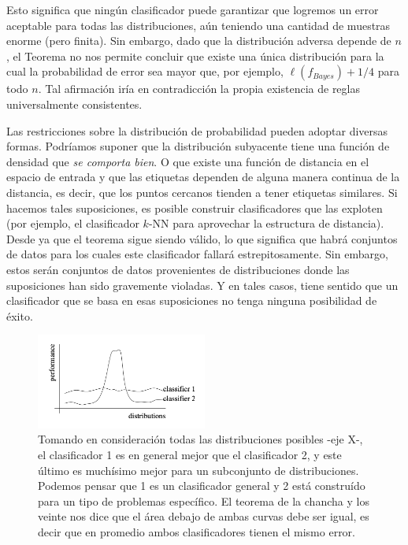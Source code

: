 \documentclass{report}
\begin{document}
Esto significa que ningún clasificador puede garantizar que logremos un error aceptable 
para todas las distribuciones, aún teniendo una cantidad de muestras enorme (pero finita). 
Sin embargo, dado que la distribución adversa depende de \(n\), 
el Teorema no nos permite concluir que existe una única distribución para la cual la 
probabilidad de error sea mayor que, por ejemplo, \(\ell(f_{Bayes}) + 1/4\) para todo \(n\). Tal afirmación 
iría en contradicción la propia existencia de reglas universalmente consistentes. \newline


Las restricciones sobre la distribución de probabilidad pueden adoptar diversas formas. Podríamos suponer que la distribución 
subyacente tiene una función de densidad que \textit{se comporta bien}. O
que existe una función de distancia en el espacio de entrada y que las etiquetas dependen de alguna manera 
continua de la distancia, es decir, que los puntos cercanos tienden a tener etiquetas similares. Si 
hacemos tales suposiciones, es posible construir clasificadores que las exploten (por ejemplo, el clasificador 
\(k\)-NN para aprovechar la estructura de distancia). Desde ya que el teorema sigue siendo válido, lo que significa que habrá conjuntos de datos 
para los cuales este clasificador fallará estrepitosamente. Sin embargo, estos serán conjuntos de datos 
provenientes de distribuciones donde las suposiciones han sido gravemente violadas. Y en tales casos, tiene 
sentido que un clasificador que se basa en esas suposiciones no tenga ninguna posibilidad de éxito.

\begin{figure}[ht!]
    \centering
    \includegraphics[width=0.5\textwidth]{Images/7.png}
    \caption{Tomando en consideración todas las distribuciones posibles -eje X-, el clasificador 1
    es en general mejor que el clasificador 2, y este último es muchísimo mejor para un subconjunto
    de distribuciones. Podemos pensar que 1 es un clasificador general y 2 está construído para un tipo
    de problemas específico. El teorema de la chancha y los veinte nos dice que el área debajo de ambas
    curvas debe ser igual, es decir que en promedio ambos clasificadores tienen el mismo error.}
    \label{fig:no_free_lunch_theorem}
\end{figure}
\end{document}
